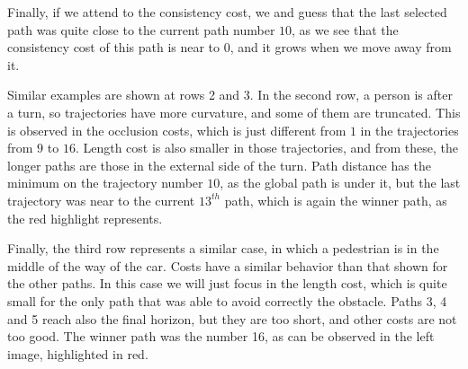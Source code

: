 Finally, if we attend to the consistency cost, we and guess that the last selected path was quite close to the current path number $10$, as we see that the consistency cost of this path is near to $0$, and it grows when we move away from it.

Similar examples are shown at rows 2 and 3. In the second row, a person is after a turn, so trajectories have more curvature, and some of them are truncated. This is observed in the occlusion costs, which is just different from $1$ in the trajectories from $9$ to $16$. Length cost is also smaller in those trajectories, and from these, the longer paths are those in the external side of the turn. Path distance has the minimum on the trajectory number $10$, as the global path is under it, but the last trajectory was near to the current $13^{th}$ path, which is again the winner path, as the red highlight represents.

Finally, the third row represents a similar case, in which a pedestrian is in the middle of the way of the car. Costs have a similar behavior than that shown for the other paths. In this case we will just focus in the length cost, which is quite small for the only path that was able to avoid correctly the obstacle. Paths 3, 4 and 5 reach also the final horizon, but they are too short, and other costs are not too good. The winner path was the number 16, as can be observed in the left image, highlighted in red.

